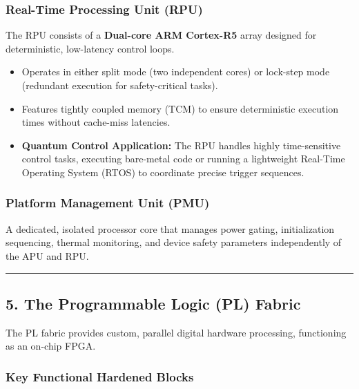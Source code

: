 \documentclass[
]{article}
\providecommand{\tightlist}{%
  \setlength{\itemsep}{0pt}\setlength{\parskip}{0pt}}
\begin{document}
\subsubsection{Real-Time Processing Unit
(RPU)}\label{real-time-processing-unit-rpu}

The RPU consists of a \textbf{Dual-core ARM Cortex-R5} array designed
for deterministic, low-latency control loops.

\begin{itemize}
\tightlist
\item
  Operates in either split mode (two independent cores) or lock-step
  mode (redundant execution for safety-critical tasks).
\item
  Features tightly coupled memory (TCM) to ensure deterministic
  execution times without cache-miss latencies.
\item
  \textbf{Quantum Control Application:} The RPU handles highly
  time-sensitive control tasks, executing bare-metal code or running a
  lightweight Real-Time Operating System (RTOS) to coordinate precise
  trigger sequences.
\end{itemize}

\subsubsection{Platform Management Unit
(PMU)}\label{platform-management-unit-pmu}

A dedicated, isolated processor core that manages power gating,
initialization sequencing, thermal monitoring, and device safety
parameters independently of the APU and RPU.

\begin{center}\rule{0.5\linewidth}{0.5pt}\end{center}

\subsection{5. The Programmable Logic (PL)
Fabric}\label{the-programmable-logic-pl-fabric}

The PL fabric provides custom, parallel digital hardware processing,
functioning as an on-chip FPGA.

\subsubsection{Key Functional Hardened
Blocks}\label{key-functional-hardened-blocks}
\end{document}
